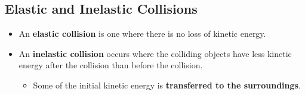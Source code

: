 \subsection{Elastic and Inelastic Collisions}

\begin{itemize}
    \item An \textbf{elastic collision} is one where there is no loss of kinetic energy.
    \item An \textbf{inelastic collision} occurs where the colliding objects have less kinetic energy after the collision than before the collision.
        \begin{itemize}
            \item Some of the initial kinetic energy is \textbf{transferred to the surroundings}.
        \end{itemize}
\end{itemize}
